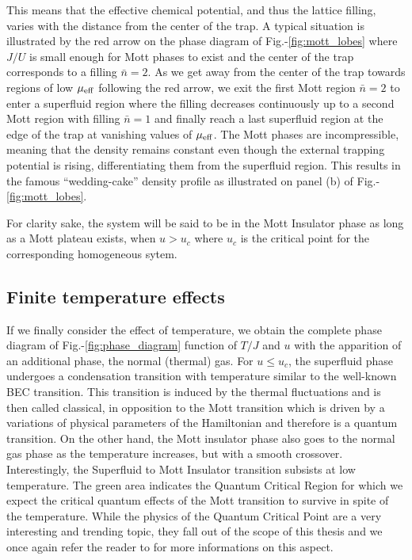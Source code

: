 \noindent This means that the effective chemical potential, and thus the lattice filling, varies with the distance from the center of the trap. A typical situation is illustrated by the red arrow on the phase diagram of Fig.-\ref{fig:mott_lobes} where $J/U$ is small enough for Mott phases to exist and the center of the trap corresponds to a filling $\bar{n}=2$. As we get away from the center of the trap towards regions of low $\mu_{\rm{eff}}$ following the red arrow, we exit the first Mott region $\bar{n}=2$ to enter a superfluid region where the filling decreases continuously up to a second Mott region with filling $\bar{n}=1$ and finally reach a last superfluid region at the edge of the trap at vanishing values of $\mu_{\rm{eff}}$. The Mott phases are incompressible, meaning that the density remains constant even though the external trapping potential is rising, differentiating them from the superfluid region. This results in the famous ``wedding-cake'' density profile as illustrated on panel (b) of Fig.-\ref{fig:mott_lobes}.

\noindent For clarity sake, the system will be said to be in the Mott Insulator phase as long as a Mott plateau exists, \ie when $u > u_c$ where $u_c$ is the critical point for the corresponding homogeneous sytem.

\subsection{Finite temperature effects}

If we finally consider the effect of temperature, we obtain the complete phase diagram of Fig.-\ref{fig:phase_diagram} function of $T/J$ and $u$ with the apparition of an additional phase, the normal (thermal) gas. For $u \leq u_c$, the superfluid phase undergoes a condensation transition with temperature similar to the well-known BEC transition. This transition is induced by the thermal fluctuations and is then called classical, in opposition to the Mott transition which is driven by a variations of physical parameters of the Hamiltonian and therefore is a quantum transition. On the other hand, the Mott insulator phase also goes to the normal gas phase as the temperature increases, but with a smooth crossover. Interestingly, the Superfluid to Mott Insulator transition subsists at low temperature. The green area indicates the Quantum Critical Region for which we expect the critical quantum effects of the Mott transition to survive in spite of the temperature. While the physics of the Quantum Critical Point are a very interesting and trending topic, they fall out of the scope of this thesis and we once again refer the reader to \cite{carcy_these} for more informations on this aspect.


